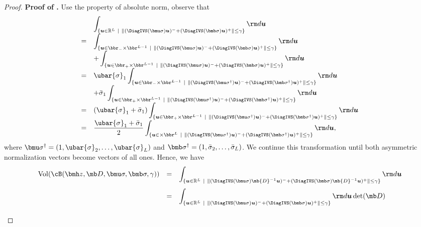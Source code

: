 \documentclass[opre, blindrev]{informs4}
\newcommand{\1}[1]{\mathds{1}{\left(#1\right)}}
\begin{document}
\begin{appendices}
\begin{proof}{\bf Proof of .}
Use the property of absolute norm, observe that 
\[
\begin{array}{cl}
& \displaystyle \int_{\{ \bm u \in \mathbb{R}^L ~|~ \| (\DiagIVS(\bmu \sigma) \bm u)^- + (\DiagIVS(\bmb \sigma) \bm u)^+\| \leq \gamma \}} {\rm d} \bm u \\
= & \displaystyle  \int_{\{\bm u \in \bbr_-\times \bbr^{L-1} ~|~ \|(\DiagIVS(\bmu \sigma) \bm u)^- + (\DiagIVS(\bmb \sigma) \bm u)^+\| \leq \gamma \}} {\rm d} \bm u \\
& \displaystyle + \int_{\{\bm u \in \bbr_+\times \bbr^{L-1} ~|~ \|(\DiagIVS(\bmu \sigma)\bm u)^- + (\DiagIVS(\bmb \sigma) \bm u)^+\| \leq \gamma\}} {\rm d} \bm u \\
= & \displaystyle \ubar{\sigma}_{1} \int_{\{\bm u \in \bbr_-\times \bbr^{L-1} ~|~ \|(\DiagIVS(\bmu \sigma^\dag)  \bm u)^- + (\DiagIVS(\bmb \sigma^\dag) \bm u)^+\| \leq \gamma\}}  {\rm d} \bm u \\
& \displaystyle  \displaystyle  + \bar{\sigma}_{1} \int_{\{\bm u \in \bbr_+\times \bbr^{L-1} ~|~ \|(\DiagIVS(\bmu \sigma^\dag) \bm u)^- + (\DiagIVS(\bmb \sigma^\dag) \bm u)^+\| \leq \gamma\}}  {\rm d} \bm u \\
= & \displaystyle (\ubar{\sigma}_{1} + \bar{\sigma}_{1}) \int_{\{\bm u \in \bbr_+\times \bbr^{L-1} ~|~ \| (\DiagIVS(\bmu \sigma^\dag)\bm u)^- +  (\DiagIVS(\bmb \sigma^\dag) \bm u)^+\| \leq \gamma\}}  {\rm d} \bm u \\
= & \displaystyle \frac{\ubar{\sigma}_{1} + \bar{\sigma}_{1}}{2} \int_{\{\bm u \in \times \bbr^{L} ~|~ \|(\DiagIVS(\bmu \sigma^\dag) \bm u)^- + (\DiagIVS(\bmb \sigma^\dag) \bm u)^+\| \leq \gamma\}}  {\rm d} \bm u,
\end{array}
\]
where $\bmu \sigma^\dag = (1, \ubar{\sigma}_{2}, \dots, \ubar{\sigma}_{L})$ and $\bmb \sigma^\dag = (1, \bar{\sigma}_{2},\dots, \bar{\sigma}_{L})$.
We continue this transformation until both asymmetric normalization vectors become vectors of all ones. Hence, we have
$$
\begin{array}{rcl}
\mathrm{Vol}(\cB(\bmh z, \mb D, \bmu \sigma, \bmb \sigma , \gamma)) & = & \displaystyle \int_{\{ \bm u \in \mathbb{R}^L ~|~ \|(\DiagIVS(\bmu \sigma) \mb{D}^{-1} \bm u)^- + (\DiagIVS(\bmb \sigma) \mb{D}^{-1} \bm u)^+\| \leq \gamma \} } {\rm d} \bm u \\[5mm]
& = & \displaystyle \int_{\{ \bm u \in \mathbb{R}^L ~|~ \|(\DiagIVS(\bmu \sigma) \bm u)^- + (\DiagIVS(\bmb \sigma) \bm u)^+\| \leq \gamma \}} {\rm d} \bm u  \det(\mb D) \\[5mm]

\end{array}$$
\end{proof}
\end{appendices}
\end{document}
